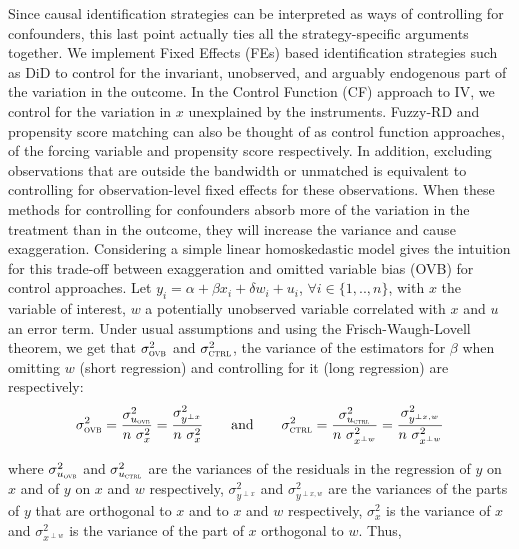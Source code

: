 			Since causal identification strategies can be interpreted as ways of controlling for confounders, this last point actually ties all the strategy-specific arguments together. We implement Fixed Effects (FEs) based identification strategies such as DiD to control for the invariant, unobserved, and arguably endogenous part of the variation in the outcome. In the Control Function (CF) approach to IV, we control for the variation in $x$ unexplained by the instruments. %
			 Fuzzy-RD and propensity score matching can also be thought of as control function approaches, of the forcing variable and propensity score respectively. In addition, excluding observations that are outside the bandwidth or unmatched is equivalent to controlling for observation-level fixed effects for these observations. When these methods for controlling for confounders absorb more of the variation in the treatment than in the outcome, they will increase the variance and cause exaggeration. Considering a simple linear homoskedastic model gives the intuition for this trade-off between exaggeration and omitted variable bias (OVB) for control approaches.  Let $y_{i} = \alpha + \beta x_{i} + \delta w_{i} + u_{i}$, $\forall i \in \{1, .., n\}$,  with $x$ the variable of interest, $w$ a potentially unobserved variable correlated with $x$ and $u$ an error term. Under usual assumptions and using the Frisch-Waugh-Lovell theorem, we get that $ \sigma_{\textsc{ovb}}^2$ and $ \sigma_{\textsc{ctrl}}^2$, the variance of the estimators for $\beta$ when omitting $w$ (short regression) and controlling for it (long regression) are respectively:
			~
			\[
				\sigma_{\textsc{ovb}}^2 =
				 \dfrac{\sigma^{2}_{u_{\textsc{ovb}}}}{n \ \sigma_{x}^{2}} =
				 \dfrac{\sigma^{2}_{y^{\perp x}}}{n \ \sigma_{x}^{2}}
				 \qquad \text{and} \qquad
				 \sigma_{\textsc{ctrl}}^2 = 
				 \dfrac{\sigma^{2}_{u_{\textsc{ctrl}}}}{n \ \sigma_{x^{\perp w}}^{2}} =
				  \dfrac{\sigma^{2}_{y^{\perp x, w}}}{n \ \sigma_{x^{\perp w}}^{2}}
			\]
			
			where $\sigma^{2}_{u_{\textsc{ovb}}}$ and $\sigma^{2}_{u_{\textsc{ctrl}}}$ are the variances of the residuals in the regression of $y$ on $x$ and of $y$ on $x$ and $w$ respectively, $\sigma^{2}_{y^{\perp x}}$ and $\sigma^{2}_{y^{\perp x, w}}$ are the variances of the parts of $y$ that are orthogonal to $x$ and to $x$ and $w$ respectively, $\sigma^{2}_{x}$ is the variance of $x$ and $\sigma^{2}_{x^{\perp w}}$ is the variance of the part of $x$ orthogonal to $w$. Thus,
			
